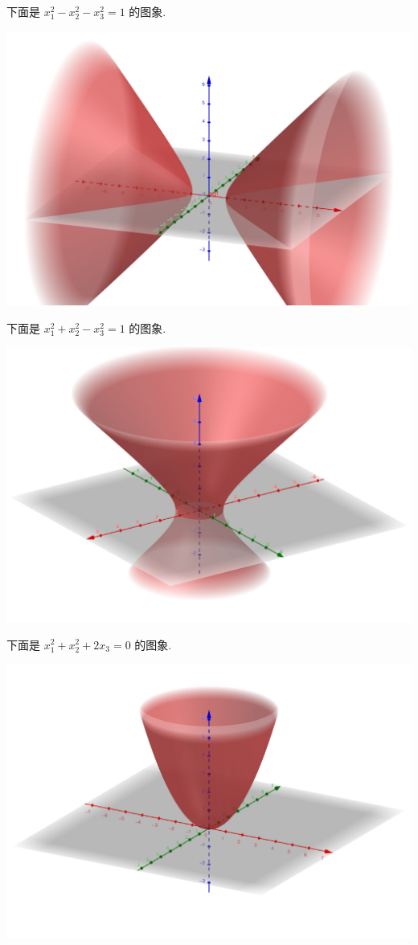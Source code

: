 \documentclass{ctexart}
\begin{document}
下面是 $x_1^2-x_2^2-x_3^2=1$ 的图象.
\begin{center}
    \includegraphics[scale=.2]{materials/1.png}
\end{center}
下面是 $x_1^2+x_2^2-x_3^2=1$ 的图象.
\begin{center}
    \includegraphics[scale=.2]{materials/2.png}
\end{center}
下面是 $x_1^2+x_2^2+2x_3=0$ 的图象.
\begin{center}
    \includegraphics[scale=.2]{materials/3.png}
\end{center}
\end{document}
